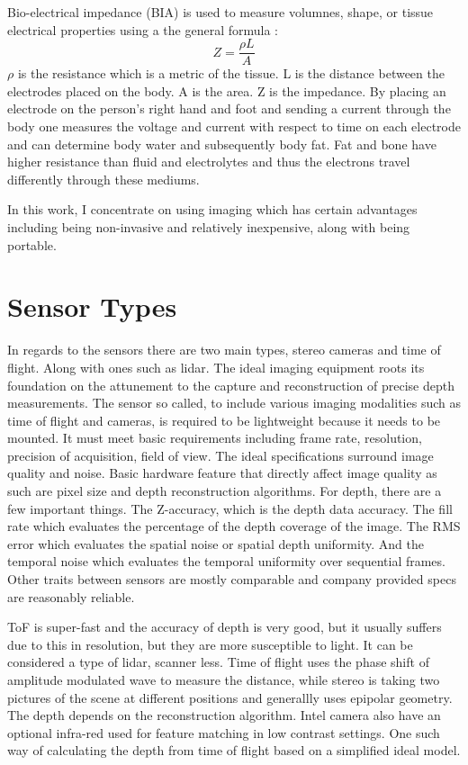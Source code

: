 Bio-electrical impedance (BIA) is used to measure volumnes, shape, or tissue electrical properties using a the general formula \cite{jaffrin2008body}:
\begin{equation}
	Z = \frac{\rho L}{A}
\end{equation}
$\rho$ is the resistance which is a metric of the tissue. L is the distance between the electrodes placed on the body. A is the area. Z is the impedance. By placing an electrode on the person's right hand and foot and sending a current through the body one measures the voltage and current with respect to time on each electrode and can determine body water and subsequently body fat. Fat and bone have higher resistance than fluid and electrolytes and thus the electrons travel differently through these mediums.

In this work, I concentrate on using imaging which has certain advantages including being non-invasive and relatively inexpensive, along with being portable.
\section{Sensor Types}
In regards to the sensors there are two main types, stereo cameras and time of flight. Along with ones such as lidar. The ideal imaging equipment roots its foundation on the attunement to the capture and reconstruction of precise depth measurements. The sensor so called, to include various imaging
modalities such as time of flight and cameras, is required to be lightweight because it needs to be
mounted. It must meet basic requirements including frame rate, resolution, precision of
acquisition, field of view. The ideal specifications surround image quality and noise. Basic hardware feature that directly affect image quality as such are pixel size and depth reconstruction algorithms. For depth, there
are a few important things. The Z-accuracy, which is the depth data accuracy. The fill rate which
evaluates the percentage of the depth coverage of the image. The RMS error which evaluates the
spatial noise or spatial depth uniformity. And the temporal noise which evaluates the temporal
uniformity over sequential frames. Other traits between sensors are mostly comparable and
company provided specs are reasonably reliable.

ToF is super-fast and the accuracy of depth is very good, but it usually suffers due to this in resolution, but they are more susceptible to light. It can be considered a type of lidar, scanner less. Time of flight uses the phase shift of amplitude modulated wave to measure the distance, while stereo is taking two pictures of the scene at different positions and generallly uses epipolar geometry. The depth depends on the reconstruction algorithm. Intel camera also have an optional infra-red used for feature matching in low contrast settings. One such way of calculating the depth from time of flight based on a simplified ideal model.

